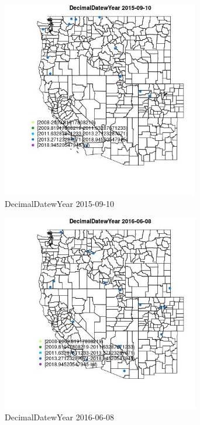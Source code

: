 \begin{figure} 
\centering  
\includegraphics[width=0.77\textwidth]{Code_Outputs/Report_ML_input_PM25_Step4_part_e_de_duplicated_aves_MapObsDecimalDatewYear2015-09-10.jpg} 
\caption{\label{fig:Report_ML_input_PM25_Step4_part_e_de_duplicated_avesMapObsDecimalDatewYear2015-09-10}DecimalDatewYear 2015-09-10} 
\end{figure} 
 

\begin{figure} 
\centering  
\includegraphics[width=0.77\textwidth]{Code_Outputs/Report_ML_input_PM25_Step4_part_e_de_duplicated_aves_MapObsDecimalDatewYear2016-06-08.jpg} 
\caption{\label{fig:Report_ML_input_PM25_Step4_part_e_de_duplicated_avesMapObsDecimalDatewYear2016-06-08}DecimalDatewYear 2016-06-08} 
\end{figure} 
 

